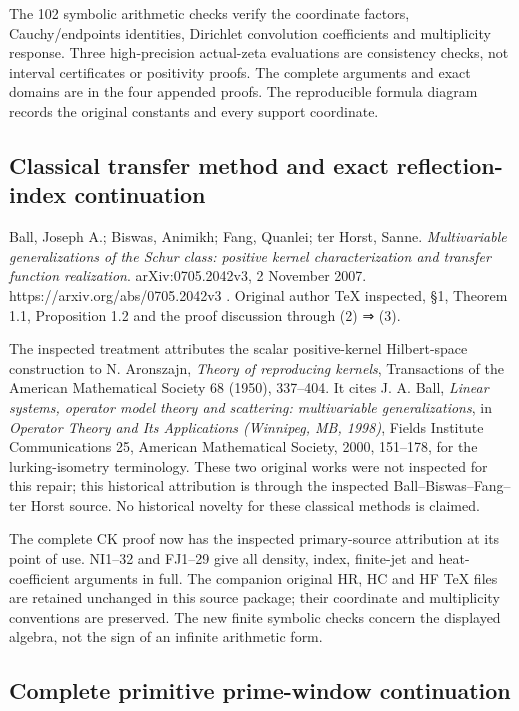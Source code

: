 \documentclass[
  10pt,
  a4paper,
]{article}
\begin{document}
The 102 symbolic arithmetic checks verify the coordinate factors,
Cauchy/endpoints identities, Dirichlet convolution coefficients and
multiplicity response. Three high-precision actual-zeta evaluations are
consistency checks, not interval certificates or positivity proofs. The
complete arguments and exact domains are in the four appended proofs.
The reproducible formula diagram records the original constants and
every support coordinate.

\subsection{Classical transfer method and exact reflection-index
continuation}\label{classical-transfer-method-and-exact-reflection-index-continuation}

Ball, Joseph A.; Biswas, Animikh; Fang, Quanlei; ter Horst, Sanne.
\emph{Multivariable generalizations of the Schur class: positive kernel
characterization and transfer function realization}. arXiv:0705.2042v3,
2 November 2007. https://arxiv.org/abs/0705.2042v3 . Original author TeX
inspected, §1, Theorem 1.1, Proposition 1.2 and the proof discussion
through (2) ⇒ (3).

The inspected treatment attributes the scalar positive-kernel
Hilbert-space construction to N. Aronszajn, \emph{Theory of reproducing
kernels}, Transactions of the American Mathematical Society 68 (1950),
337--404. It cites J. A. Ball, \emph{Linear systems, operator model
theory and scattering: multivariable generalizations}, in \emph{Operator
Theory and Its Applications (Winnipeg, MB, 1998)}, Fields Institute
Communications 25, American Mathematical Society, 2000, 151--178, for
the lurking-isometry terminology. These two original works were not
inspected for this repair; this historical attribution is through the
inspected Ball--Biswas--Fang--ter Horst source. No historical novelty
for these classical methods is claimed.

The complete CK proof now has the inspected primary-source attribution
at its point of use. NI1--32 and FJ1--29 give all density, index,
finite-jet and heat-coefficient arguments in full. The companion
original HR, HC and HF TeX files are retained unchanged in this source
package; their coordinate and multiplicity conventions are preserved.
The new finite symbolic checks concern the displayed algebra, not the
sign of an infinite arithmetic form.

\subsection{Complete primitive prime-window
continuation}\label{complete-primitive-prime-window-continuation}
\end{document}
